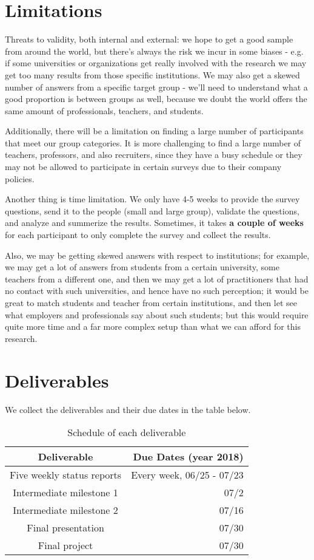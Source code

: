 \documentclass{sigchi}
\begin{document}
 
 \section{Limitations}
 Threats to validity, both internal and external: we hope to get a good sample from around the world, but there's always the risk we incur in some biases - e.g. if some universities or organizations get really involved with the research we may get too many results from those specific institutions. We may also get a skewed number of answers from a specific target group - we'll need to understand what a good proportion is between groups as well, because we doubt the world offers the same amount of professionals, teachers, and students.
 
Additionally, there will be a limitation on finding a large number of participants that meet our group categories. It is more challenging to find a large number of teachers, professors, and also recruiters, since they have a busy schedule or they may not be allowed to participate in certain surveys due to their company policies. 
  
 Another thing is time limitation. We only have 4-5 weeks to provide the survey questions, send it to the people (small and large group), validate the questions, and analyze and summerize the results. Sometimes, it takes \textbf{a couple of weeks} for each participant to only complete the survey and collect the results.
 
 Also, we may be getting skewed answers with respect to institutions; for example, we may get a lot of answers from students from a certain university, some teachers from a different one, and then we may get a lot of practitioners that had no contact with such universities, and hence have no such perception; it would be great to match students and teacher from certain institutions, and then let see what employers and professionals say about such students; but this would require quite more time and a far more complex setup than what we can afford for this research.
 
  
 \section{Deliverables}
 We collect the deliverables and their due dates in the table below.
 
 \begin{table}[H]
 \centering
 \begin{tabular}{c r} 					%
 \hline\hline						%
 Deliverable & Due Dates (year 2018)\\
 \hline
 Five weekly status reports & Every week, 06/25 - 07/23\\
 Intermediate milestone 1 & 07/2\\
 Intermediate milestone 2 & 07/16\\
 Final presentation & 07/30\\
 Final project & 07/30\\
 \hline
 \end{tabular}
 \caption{Schedule of each deliverable} 	%
 \end{table}
	  
\end{document}
